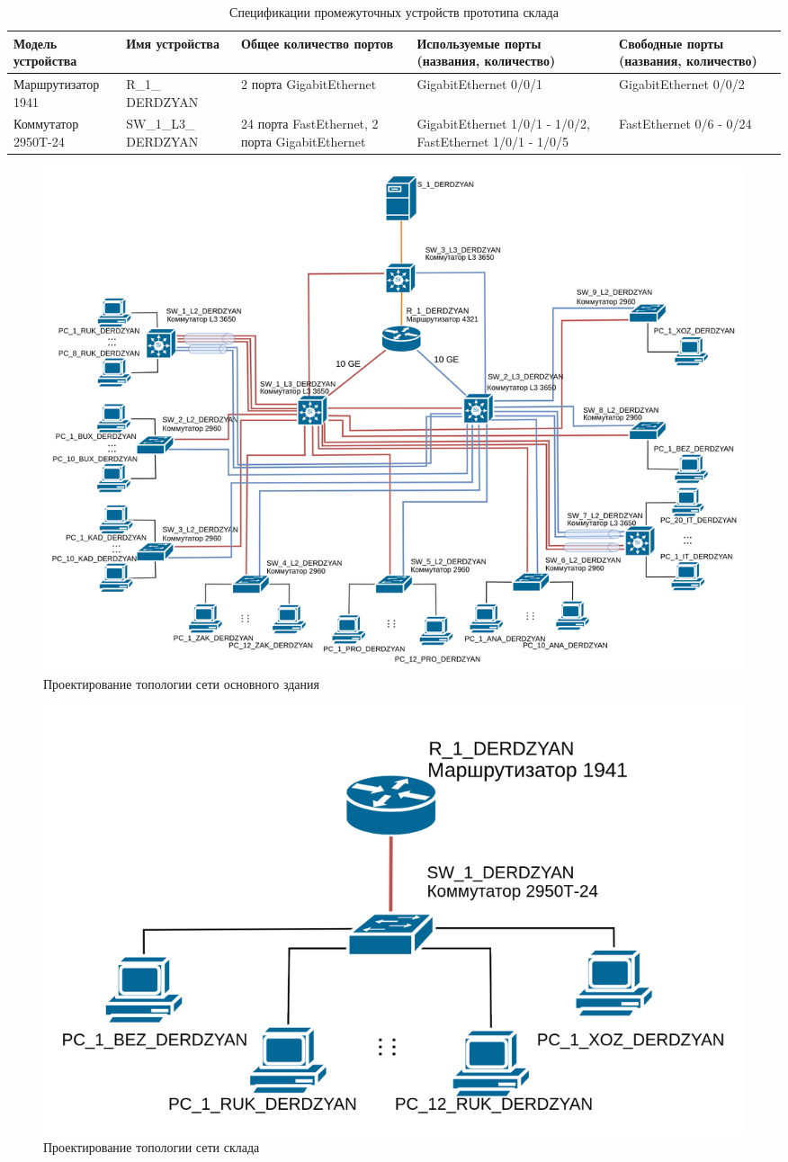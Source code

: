 \begin{table}[H]
    \centering
	\caption{Спецификации промежуточных устройств прототипа склада\label{table:specif_uzlov_sk}}
    \small
	\begin{tabularx}{\textwidth}{|X|X|X|X|X|}
        \hline
		Модель устройства&Имя устройства& Общее количество портов&Используемые порты (названия, количество) & Свободные порты (названия, количество) \\
        \hline
		Маршрутизатор 1941	&	R\_1\_ DERDZYAN  & 2 порта GigabitEthernet & GigabitEthernet 0/0/1  &	GigabitEthernet 0/0/2	\\
		\hline
		Коммутатор 2950T-24		&	SW\_1\_L3\_ DERDZYAN  & 24 порта FastEthernet, 2 порта GigabitEthernet & GigabitEthernet 1/0/1 - 1/0/2, FastEthernet 1/0/1 - 1/0/5 & FastEthernet 0/6 - 0/24	\\
		\hline
    \end{tabularx}
\end{table}

\begin{figure}[H]
\centering
\includegraphics[scale=0.12]{../misc/topo_oz.png}
\caption{Проектирование топологии сети основного здания\label{fig:topo_oz}}
\end{figure}

\begin{figure}[H]
\centering
\includegraphics[scale=0.20]{../misc/topo_sk.png}
\caption{Проектирование топологии сети склада\label{fig:topo_sk}}
\end{figure}

